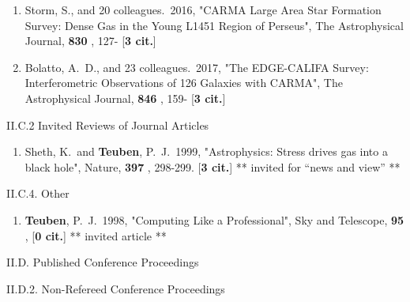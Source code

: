 \documentclass[11pt,letterpaper]{article}
\begin{document}
\begin{enumerate}[label=\textbf{\arabic*}.]
\item  
Storm, S., and 20 colleagues.\  2016,  "CARMA Large Area Star Formation 
Survey: Dense Gas in the Young L1451 Region of Perseus", The Astrophysical 
Journal,  {\bf 830} , 127- [{\bf 3 cit.}] 

\item  
Bolatto, A.~D., and 23 colleagues.\  2017,  "The EDGE-CALIFA Survey: 
Interferometric Observations of 126 Galaxies with CARMA", The Astrophysical 
Journal,  {\bf 846} , 159- [{\bf 3 cit.}] 


\end{enumerate}


II.C.2  Invited Reviews of Journal Articles


\begin{enumerate}[resume,label=\textbf{\arabic*}.]

\item  
Sheth, K.~and {\bf Teuben}, P.~J.\  1999,  "Astrophysics:  Stress drives gas 
into a black hole", Nature,  {\bf 397} , 298-299.  [{\bf 3 cit.}] 
** invited for ``news and view'' **

\end{enumerate}


II.C.4. Other


\begin{enumerate}[resume,label=\textbf{\arabic*}.]
  
\item  
{\bf Teuben}, P.~J.\  1998,  "Computing Like a Professional", Sky and Telescope,  
{\bf 95} ,  [{\bf 0 cit.}] 
** invited article **
  
\end{enumerate}
                

II.D. Published Conference Proceedings


II.D.2. Non-Refereed Conference Proceedings

\end{document}
